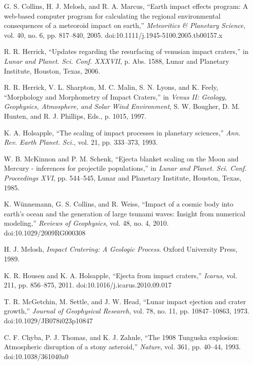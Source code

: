 \documentclass[conference]{IEEEtran}
\begin{document}
\begin{thebibliography}{00}

	G. S. Collins, H. J. Melosh, and R. A. Marcus, ``Earth impact effects program: A web-based computer program for calculating the regional environmental consequences of a meteoroid impact on earth,'' \textit{Meteoritics \& Planetary Science}, vol. 40, no. 6, pp. 817--840, 2005. doi:10.1111/j.1945-5100.2005.tb00157.x

	R. R. Herrick, ``Updates regarding the resurfacing of venusian impact craters,'' in \textit{Lunar and Planet. Sci. Conf. XXXVII}, p. Abs. 1588, Lunar and Planetary Institute, Houston, Texas, 2006.

	R. R. Herrick, V. L. Sharpton, M. C. Malin, S. N. Lyons, and K. Feely, ``Morphology and Morphometry of Impact Craters,'' in \textit{Venus II: Geology, Geophysics, Atmosphere, and Solar Wind Environment}, S. W. Bougher, D. M. Hunten, and R. J. Phillips, Eds., p. 1015, 1997.

	K. A. Holsapple, ``The scaling of impact processes in planetary sciences,'' \textit{Ann. Rev. Earth Planet. Sci.}, vol. 21, pp. 333--373, 1993.

	W. B. McKinnon and P. M. Schenk, ``Ejecta blanket scaling on the Moon and Mercury - inferences for projectile populations,'' in \textit{Lunar and Planet. Sci. Conf. Proceedings XVI}, pp. 544--545, Lunar and Planetary Institute, Houston, Texas, 1985.

	K. Wünnemann, G. S. Collins, and R. Weiss, ``Impact of a cosmic body into earth’s ocean and the generation of large tsunami waves: Insight from numerical modeling,'' \textit{Reviews of Geophysics}, vol. 48, no. 4, 2010. doi:10.1029/2009RG000308

	H. J. Melosh, \textit{Impact Cratering: A Geologic Process}. Oxford University Press, 1989.

	K. R. Housen and K. A. Holsapple, ``Ejecta from impact craters,'' \textit{Icarus}, vol. 211, pp. 856--875, 2011. doi:10.1016/j.icarus.2010.09.017

	T. R. McGetchin, M. Settle, and J. W. Head, ``Lunar impact ejection and crater growth,'' \textit{Journal of Geophysical Research}, vol. 78, no. 11, pp. 10847--10863, 1973. doi:10.1029/JB078i023p10847

	C. F. Chyba, P. J. Thomas, and K. J. Zahnle, ``The 1908 Tunguska explosion: Atmospheric disruption of a stony asteroid,'' \textit{Nature}, vol. 361, pp. 40--44, 1993. doi:10.1038/361040a0


\end{thebibliography}
\end{document}
